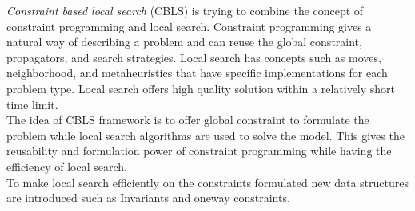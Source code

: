 \emph{Constraint based local search} (CBLS) is trying to combine the concept of constraint programming and local 
search. Constraint programming gives a natural way of describing a problem and can reuse the global constraint, 
propagators, and search strategies. Local search has concepts such as moves, neighborhood, and metaheuristics that have 
specific implementations for each problem type. Local search offers high quality solution within a relatively short time 
limit. \\ 
The idea of CBLS framework is to offer global constraint to formulate the problem while local search algorithms are 
used to solve the model. This gives the reusability and formulation power of constraint programming while having the 
efficiency of local search. \\ 
To make local search efficiently on the constraints formulated new data structures are introduced such as Invariants 
and oneway constraints. 